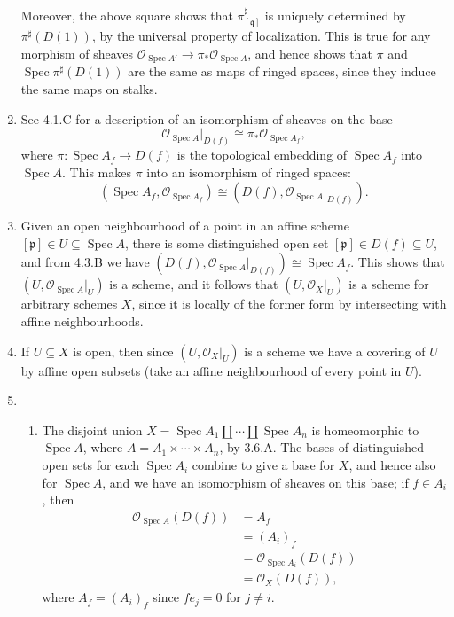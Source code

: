 \documentclass{report}
\newcommand{\p}{\mathfrak{p}}
\newcommand{\q}{\mathfrak{q}}
\renewcommand{\O}{\mathscr{O}} %
\DeclareMathOperator{\Spec}{Spec}
\begin{document}
\begin{enumerate}[label=\textbf{4.3.\Alph*.}]
	      Moreover, the above square shows that $\pi^\sharp_{[\q]}$ is uniquely
	      determined by $\pi^\sharp(D(1))$, by the universal property of
	      localization. This is true for any morphism of sheaves
	      $\O_{\Spec A'}\to\pi_*\O_{\Spec A}$, and hence shows that $\pi$ and
	      $\Spec\pi^\sharp(D(1))$ are the same as maps of ringed spaces, since
	      they induce the same maps on stalks.

	\item See 4.1.C for a description of an isomorphism of sheaves on the base
	      \begin{equation*}
		      \O_{\Spec A}|_{D(f)} \cong \pi_*\O_{\Spec A_f},
	      \end{equation*}
	      where $\pi:\Spec A_f\to D(f)$ is the topological embedding of $\Spec A_f$
	      into $\Spec A$. This makes $\pi$ into an isomorphism of ringed spaces:
	      \begin{equation*}
		      (\Spec A_f,\O_{\Spec A_f})\cong(D(f),\O_{\Spec A}|_{D(f)}).
	      \end{equation*}

	\item Given an open neighbourhood of a point in an affine scheme
	      $[\p]\in U\subseteq\Spec A$, there is some distinguished open set
	      $[\p]\in D(f)\subseteq U$, and from 4.3.B we have
	      $(D(f),\O_{\Spec A}|_{D(f)})\cong\Spec A_f$. This shows that
	      $(U,\O_{\Spec A}|_U)$ is a scheme, and it follows that $(U,\O_X|_U)$ is
	      a scheme for arbitrary schemes $X$, since it is locally of the former
	      form by intersecting with affine neighbourhoods.

	\item If $U\subseteq X$ is open, then since $(U,\O_X|_U)$ is a scheme we
	      have a covering of $U$ by affine open subsets (take an affine
	      neighbourhood of every point in $U$).

	\item
	      \begin{enumerate}[label=(\alph*)]
		      \item The disjoint union $X=\Spec A_1\amalg\cdots\amalg\Spec A_n$ is
		            homeomorphic to $\Spec A$, where $A=A_1\times\cdots\times A_n$,
		            by 3.6.A. The bases of distinguished open sets for each
		            $\Spec A_i$ combine to give a base for $X$, and hence also for
		            $\Spec A$, and we have an isomorphism of sheaves on this base;
		            if $f\in A_i$, then
		            \begin{align*}
			            \O_{\Spec A}(D(f))
			             & = A_f                  \\
			             & = (A_i)_f              \\
			             & = \O_{\Spec A_i}(D(f)) \\
			             & = \O_X(D(f)),
		            \end{align*}
		            where $A_f=(A_i)_f$ since $fe_j=0$ for $j\ne i$.


\end{enumerate}
\end{enumerate}
\end{document}
